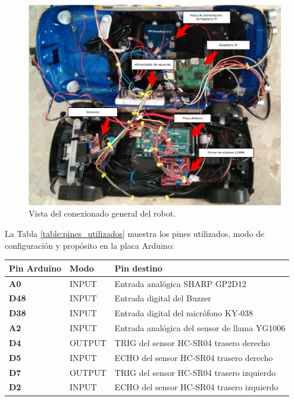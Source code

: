 \begin{figure}[H]
  \begin{center}
   \includegraphics[scale=0.3]{diagramas/conexionado_etiquetas_general.png}
  \end{center}
  \caption{Vista del conexionado general del robot.}
  \label{vista-conexiones}
\end{figure}

La Tabla \ref{table:pines_utilizados} muestra los pines utilizados, modo de configuración y propósito en la placa Arduino:\\

\begin{table}[H]
  \begin{center}
    \begin{tabular}{|p{2.5cm}|p{4cm}|p{6cm}|}
      \hline
      {\textbf{Pin Arduino}} & \textbf{ Modo } & \textbf{ Pin destino }\\
      \hline
      {\textbf{ A0 }} & { INPUT } & { Entrada analógica SHARP GP2D12 }  \\
     \hline
      {\textbf{ D48 }} & { INPUT } & { Entrada digital del Buzzer } \\
      \hline
      {\textbf{ D38 }} & { INPUT } & {  Entrada digital del micrófono KY-038 } \\
      \hline
      {\textbf{ A2 }} & { INPUT } & { Entrada analógica del sensor de llama YG1006 } \\
      \hline
      {\textbf{ D4 }} & { OUTPUT } & { TRIG del sensor HC-SR04 trasero derecho } \\
      \hline
      {\textbf{ D5 }} & { INPUT } & { ECHO del sensor HC-SR04 trasero derecho} \\
      \hline
      {\textbf{ D7 }} & { OUTPUT } & { TRIG del sensor HC-SR04 trasero izquierdo } \\
      \hline
      {\textbf{ D2 }} & { INPUT } & { ECHO del sensor HC-SR04 trasero izquierdo } \\
      \hline
      \end{tabular}
  \end{center}
\end{table}      
      

